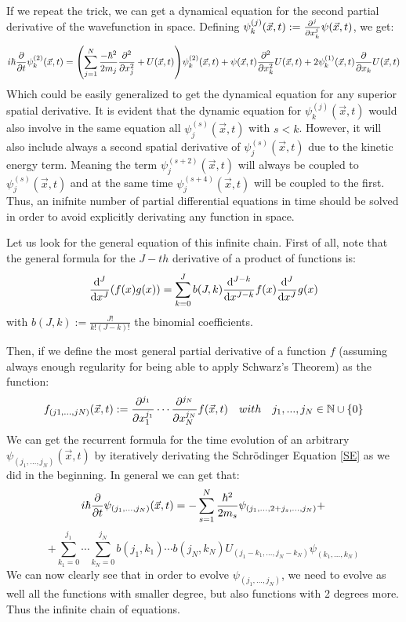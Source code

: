 \documentclass[11pt, a4paper]{article} %
\newcommand{\N}{\mathbb{N}}
\begin{document}
If we repeat the trick, we can get a dynamical equation for the second partial derivative of the wavefunction in space.
Defining $\psi^{(j)}_k(\vec{x},t):=\pdv[j]{}{x_k}\psi(\vec{x},t)$, we get:
\begin{equation}
i\hbar \pdv{}{t}\psi^{(2)}_k(\vec{x},t) = \qty(\sum_{j=1}^N\frac{-\hbar^2}{2m_j}\pdv[2]{}{x_j}+U(\vec{x},t))\psi^{(2)}_k(\vec{x},t)+ \psi(\vec{x},t)\pdv[2]{}{x_k}U(\vec{x},t)+2\psi^{(1)}_k(\vec{x},t)\pdv{}{x_k}U(\vec{x},t)
\end{equation}
Which could be easily generalized to get the dynamical equation for any superior spatial derivative. It is evident that the dynamic equation for $\psi^{(j)}_k(\vec{x},t)$ would also involve in the same equation all $\psi^{(s)}_j(\vec{x},t)$ with $s<k$. However, it will also include always a second spatial derivative of $\psi^{(s)}_j(\vec{x},t)$ due to the kinetic energy term. Meaning the term $\psi^{(s+2)}_j(\vec{x},t)$ will always be coupled to $\psi^{(s)}_j(\vec{x},t)$ and at the same time $\psi^{(s+4)}_j(\vec{x},t)$ will be coupled to the first. Thus, an inifnite number of partial differential equations in time should be solved in order to avoid explicitly derivating any function in space. 

Let us look for the general equation of this infinite chain. First of all, note that the general formula for the $J-th$ derivative of a product of functions is:
\begin{equation}
\dv[J]{}{x}\qty(f(x)g(x))=\sum_{k=0}^J b(J, k)\dv[J-k]{}{x}f(x)\dv[J]{}{x}g(x)
\end{equation}
with $b(J,k):=\frac{J!}{k!(J-k)!}$ the binomial coefficients.

Then, if we define the most general partial derivative of a function $f$ (assuming always enough regularity for being able to apply Schwarz's Theorem) as the function:
\begin{equation}\label{defPdv}
f_{(j1,...,jN)}(\vec{x},t):=\pdv[j_1]{}{x_1}\cdots\pdv[j_N]{}{x_N} f(\vec{x},t) \quad with\quad j_1,...,j_N\in \N\cup \{0\}
\end{equation}
We can get the recurrent formula for the time evolution of an arbitrary $\psi_{(j_1,...,j_N)}(\vec{x},t)$ by iteratively derivating the Schrödinger Equation \eqref{SE} as we did in the beginning. In general we can get that:
\begin{equation}\label{infchain.SE}
i\hbar \pdv{}{t}\psi_{(j_1,...,j_N)}(\vec{x},t)=-\sum_{s=1}^N\frac{\hbar^2}{2m_s}\psi_{(j_1,...,2+j_s,...,j_N)}+
\end{equation}
$$
+\sum_{k_1=0}^{j_1}\cdots\sum_{k_N=0}^{j_N} b(j_1,k_1)\cdots b(j_N,k_N)U_{(j_1-k_1,...,j_N-k_N)}\psi_{(k_1,...,k_N)}
$$
We can now clearly see that in order to evolve $\psi_{(j_1,...,j_N)}$, we need to evolve as well all the functions with smaller degree, but also functions with 2 degrees more. Thus the infinite chain of equations.
\end{document}
